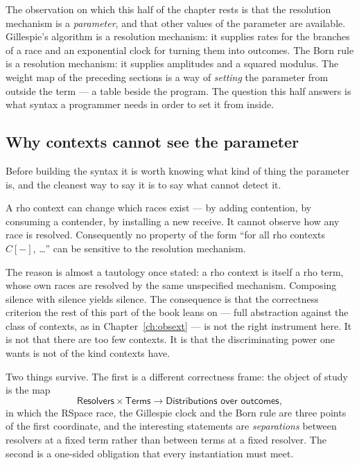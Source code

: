 The observation on which this half of the chapter rests is that the resolution mechanism
is a \emph{parameter}, and that other values of the parameter are available. Gillespie's
algorithm is a resolution mechanism: it supplies rates for the branches of a race and an
exponential clock for turning them into outcomes. The Born rule is a resolution mechanism:
it supplies amplitudes and a squared modulus. The weight map of the preceding sections is
a way of \emph{setting} the parameter from outside the term --- a table beside the
program. The question this half answers is what syntax a programmer needs in order to set
it from inside.

\subsection{Why contexts cannot see the parameter}

Before building the syntax it is worth knowing what kind of thing the parameter is, and
the cleanest way to say it is to say what cannot detect it.

\begin{principle}
\label{gw:prin:aperture}
A rho context can change which races exist --- by adding contention, by consuming a
contender, by installing a new receive. It cannot observe how any race is resolved.
Consequently no property of the form ``for all rho contexts $C[-]$, \ldots'' can be
sensitive to the resolution mechanism.
\end{principle}

The reason is almost a tautology once stated: a rho context is itself a rho term, whose
own races are resolved by the same unspecified mechanism. Composing silence with silence
yields silence. The consequence is that the correctness criterion the rest of this part
of the book leans on --- full abstraction against the class of contexts, as in
Chapter~\ref{ch:obsext} --- is not the right instrument here. It is not that there are
too few contexts. It is that the discriminating power one wants is not of the kind
contexts have.

Two things survive. The first is a different correctness frame: the object of study is
the map
\[
  \textsf{Resolvers} \times \textsf{Terms} \longrightarrow
  \textsf{Distributions over outcomes},
\]
in which the RSpace race, the Gillespie clock and the Born rule are three points of the
first coordinate, and the interesting statements are \emph{separations} between resolvers
at a fixed term rather than between terms at a fixed resolver. The second is a one-sided
obligation that every instantiation must meet.

